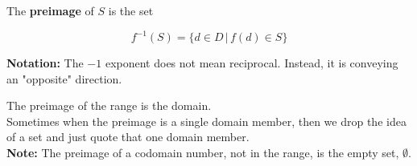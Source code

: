 \documentclass{ximera}
\begin{document}
The \textbf{preimage} of $S$ is the set

\[  f^{-1}(S) = \{ d \in D \, | \, f(d) \in S  \}    \]

\textbf{Notation:}  The $-1$ exponent does not mean reciprocal.  Instead, it is conveying an "opposite" direction.


The preimage of the range is the domain. \\

Sometimes when the preimage is a single domain member, then we drop the idea of a set and just quote that one domain member. \\


\textbf{Note:} The preimage of a codomain number, not in the range, is the empty set, $\emptyset$. \\
\end{document}
